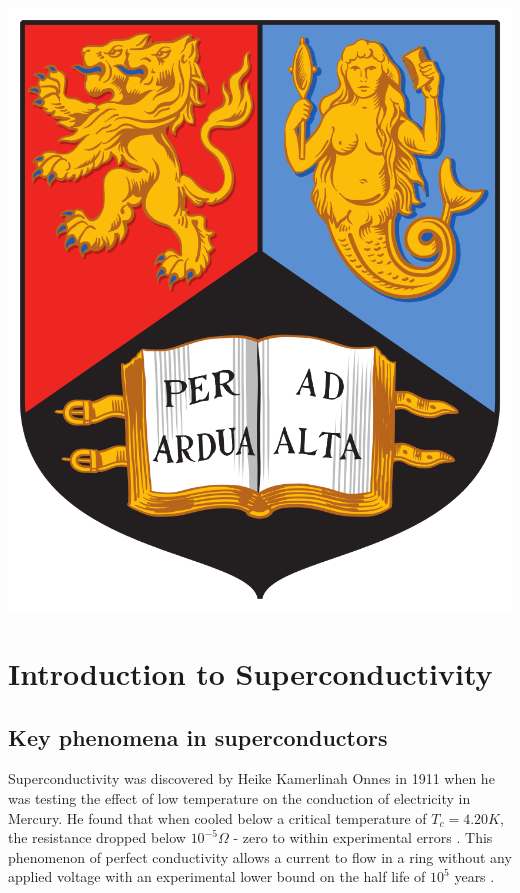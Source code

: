 \documentclass{article}
\numberwithin{equation}{section}
\begin{document}
\begin{minipage}{0.5\textwidth}\begin{flushright}	%
\includegraphics[scale = 0.06]{Resources/UoB}		%
\hspace*{20px}										%
\end{flushright}\end{minipage}						%
\vspace{20px}										%

\begin{abstract}
    
\end{abstract}
\tableofcontents

\newpage
\section{Introduction to Superconductivity}
\subsection{Key phenomena in superconductors}
Superconductivity was discovered by Heike Kamerlinah Onnes in 1911 when he was testing the effect of low temperature on the conduction of electricity in Mercury. He found that when cooled below a critical temperature of $T_c = 4.20K$, the resistance dropped below $10^{-5}\Omega$ - zero to within experimental errors \cite{VanDelft2010TheSuperconductivity}. This phenomenon of perfect conductivity allows a current to flow in a ring without any applied voltage with an experimental lower bound on the half life of $10^5$ years \cite{Tinkham2004IntroductionSuperconductivity}.
\end{document}
